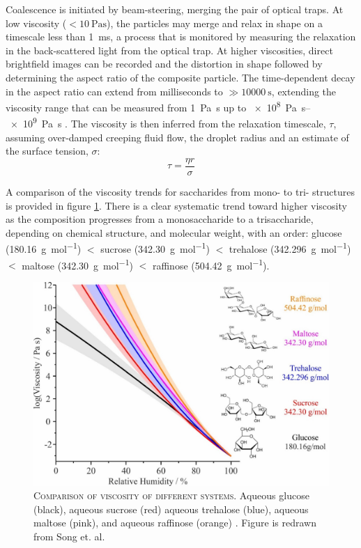 Coalescence is initiated by beam-steering, merging the pair of optical traps. At low viscosity ($<\SI{10}{\pascal\second}$), the particles may merge and relax in shape on a timescale less than \SI{1}{\milli\second}, a process that is monitored by measuring the relaxation in the back-scattered light from the optical trap. At higher viscosities, direct brightfield images can be recorded and the distortion in shape followed by determining the aspect ratio of the composite particle. The time-dependent decay in the aspect ratio can extend from milliseconds to $\gg \SI{10000}{\second}$, extending the viscosity range that can be measured from \SI{1}{\pascal\second}  up to \SIrange[range-phrase=\text{--}]{e8}{e9}{\pascal\second} \cite{Song2016a}. The viscosity is then inferred from the relaxation timescale, $\tau$, assuming over-damped creeping fluid flow, the droplet radius and an estimate of the surface tension, $\sigma$:
\begin{equation}
\tau=\frac{\eta r}{\sigma}
\end{equation}

A comparison of the viscosity trends for saccharides from mono- to tri- structures is provided in figure \ref{fig:wat_s6}. There is a clear systematic trend toward higher viscosity as the composition progresses from a monosaccharide to a trisaccharide, depending on chemical structure, and molecular weight, with an order: glucose (\SI{180.16}{\gram\per\mole}) $<$ sucrose (\SI{342.30}{\gram\per\mol}) $<$ trehalose (\SI{342.296}{\gram\per\mol}) $<$ maltose (\SI{342.30}{\gram\per\mol}) $<$ raffinose (\SI{504.42}{\gram\per\mol}).


\begin{figure}
    \centering
    \includegraphics{chapters/water_hopping/figures/image014.jpg}
    \caption[Comparison of viscosity of different systems]{\textsc{Comparison of viscosity of different systems}. Aqueous glucose (black), aqueous sucrose (red) aqueous trehalose (blue), aqueous maltose (pink), and aqueous raffinose (orange) \cite{Song2016a}. Figure is redrawn from Song et. al. \cite{Song2016a}}
    \label{fig:wat_s6}
\end{figure}

